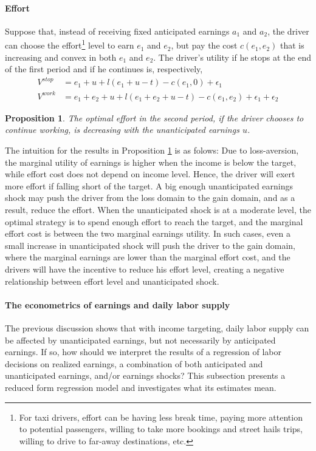 \documentclass[reviewmode]{restat}
\newtheorem{proposition}{Proposition}
\begin{document}
\paragraph{Effort} Suppose that, instead of receiving fixed anticipated earnings $a_1$ and $a_2$, the driver 
can choose the effort\footnote{For taxi drivers, effort can be having less break time, paying more attention 
to potential passengers, willing to take more bookings and street hails trips, willing to drive to far-away 
destinations, etc.} level to earn $e_1$ and $e_2$, but pay the cost $c(e_1, e_2)$ that is increasing and convex 
in both $e_1$ and $e_2$. The driver's utility if he stops at the end of the first period and if he continues is,
respectively,
\begin{align*}
V^{stop} &= e_1 + u + l(e_1+u-t) - c(e_1,0) + \epsilon_1 \\
V^{work} &= e_1 + e_2 + u + l(e_1+e_2+u-t) - c(e_1,e_2) + \epsilon_1 + \epsilon_2   
\end{align*}


\begin{proposition}
\label{prop:effort}
The optimal effort in the second period, if the driver chooses to continue working, is decreasing with the
unanticipated earnings $u$.
\end{proposition}


The intuition for the results in Proposition \ref{prop:effort} is as folows: Due to loss-aversion, 
the marginal utility of earnings is higher when the income is below the target, 
while effort cost does not depend on income level. Hence, the driver will exert more effort if
falling short of the target. A big enough unanticipated earnings shock may push the driver
from the loss domain to the gain domain, and as a result, reduce the effort. 
When the unanticipated shock is at a moderate level, the optimal strategy is to spend enough 
effort to reach the target, and the marginal effort cost is between the two marginal earnings utility. 
In such cases, even a small increase in unanticipated shock will push the driver to the gain domain,
where the marginal earnings are lower than the marginal effort cost, and the drivers will have the
incentive to reduce his effort level, creating a negative relationship between effort level 
and unanticipated shock.

\paragraph{The econometrics of earnings and daily labor supply} The previous discussion shows that with income
targeting, daily labor supply can be affected by unanticipated earnings, but not necessarily by anticipated
earnings. If so, how should we interpret the results of a regression of labor decisions on realized earnings, 
a combination of both anticipated and unanticipated earnings, and/or earnings shocks? This subsection presents 
a reduced form regression model and investigates what its estimates mean. 
\end{document}
